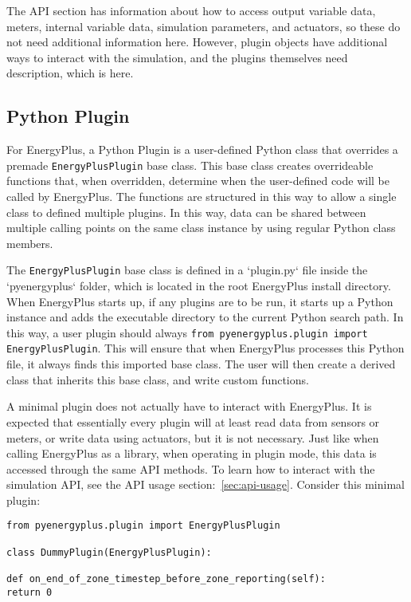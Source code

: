 The API section has information about how to access output variable data, meters, internal variable data, simulation parameters, and actuators, so these do not need additional information here.
However, plugin objects have additional ways to interact with the simulation, and the plugins themselves need description, which is here.

\subsection{Python Plugin}

For EnergyPlus, a Python Plugin is a user-defined Python class that overrides a premade \verb=EnergyPlusPlugin= base class.
This base class creates overrideable functions that, when overridden, determine when the user-defined code will be called by EnergyPlus.
The functions are structured in this way to allow a single class to defined multiple plugins.
In this way, data can be shared between multiple calling points on the same class instance by using regular Python class members.

The \verb=EnergyPlusPlugin= base class is defined in a `plugin.py` file inside the `pyenergyplus` folder, which is located in the root EnergyPlus install directory.
When EnergyPlus starts up, if any plugins are to be run, it starts up a Python instance and adds the executable directory to the current Python search path.
In this way, a user plugin should always \verb=from pyenergyplus.plugin import EnergyPlusPlugin=.
This will ensure that when EnergyPlus processes this Python file, it always finds this imported base class.
The user will then create a derived class that inherits this base class, and write custom functions.

A minimal plugin does not actually have to interact with EnergyPlus.
It is expected that essentially every plugin will at least read data from sensors or meters, or write data using actuators, but it is not necessary.
Just like when calling EnergyPlus as a library, when operating in plugin mode, this data is accessed through the same API methods.
To learn how to interact with the simulation API, see the API usage section:~\ref{sec:api-usage}.
Consider this minimal plugin:

\begin{lstlisting}
from pyenergyplus.plugin import EnergyPlusPlugin

class DummyPlugin(EnergyPlusPlugin):

def on_end_of_zone_timestep_before_zone_reporting(self):
return 0
\end{lstlisting}

